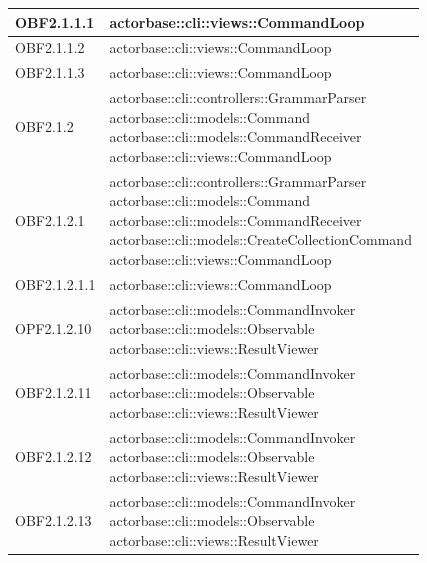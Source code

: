 \documentclass{scalatekids-article}
\begin{document}
\begin{longtable}[H]{|p{5cm}|p{12cm}|}
\hline
OBF2.1.1.1 & \multiLineCell[t]{actorbase::cli::views::CommandLoop\\}\\
\hline
OBF2.1.1.2 & \multiLineCell[t]{actorbase::cli::views::CommandLoop\\}\\
\hline
OBF2.1.1.3 & \multiLineCell[t]{actorbase::cli::views::CommandLoop\\}\\
\hline
OBF2.1.2 & \multiLineCell[t]{actorbase::cli::controllers::GrammarParser\\actorbase::cli::models::Command\\actorbase::cli::models::CommandReceiver\\actorbase::cli::views::CommandLoop\\}\\
\hline
OBF2.1.2.1 & \multiLineCell[t]{actorbase::cli::controllers::GrammarParser\\actorbase::cli::models::Command\\actorbase::cli::models::CommandReceiver\\actorbase::cli::models::CreateCollectionCommand\\actorbase::cli::views::CommandLoop\\}\\
\hline
OBF2.1.2.1.1 & \multiLineCell[t]{actorbase::cli::views::CommandLoop\\}\\
\hline
OPF2.1.2.10 & \multiLineCell[t]{actorbase::cli::models::CommandInvoker\\actorbase::cli::models::Observable\\actorbase::cli::views::ResultViewer\\}\\
\hline
OBF2.1.2.11 & \multiLineCell[t]{actorbase::cli::models::CommandInvoker\\actorbase::cli::models::Observable\\actorbase::cli::views::ResultViewer\\}\\
\hline
OBF2.1.2.12 & \multiLineCell[t]{actorbase::cli::models::CommandInvoker\\actorbase::cli::models::Observable\\actorbase::cli::views::ResultViewer\\}\\
\hline
OBF2.1.2.13 & \multiLineCell[t]{actorbase::cli::models::CommandInvoker\\actorbase::cli::models::Observable\\actorbase::cli::views::ResultViewer\\}\\

\end{longtable}
\end{document}
